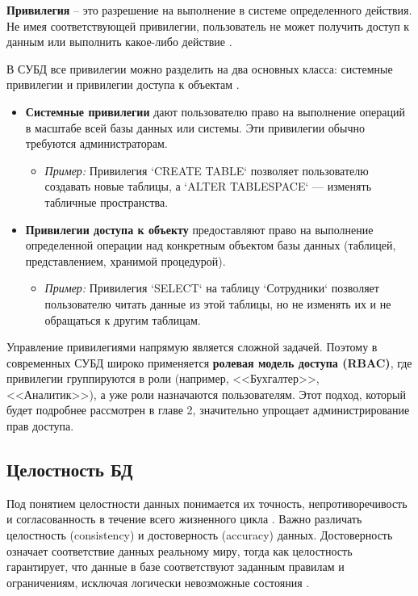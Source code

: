 \begin{grayquote}
	\textbf{Привилегия} – это разрешение на выполнение в системе определенного действия. Не имея соответствующей привилегии, пользователь не может получить доступ к данным или выполнить какое-либо действие \autocite{Smirnov2007}.
\end{grayquote}

В СУБД все привилегии можно разделить на два основных класса: системные привилегии и привилегии доступа к объектам \autocite{MicrosoftLearnSQLserverPerm}.

\begin{itemize}
    \item \textbf{Системные привилегии} дают пользователю право на выполнение операций в масштабе всей базы данных или системы. Эти привилегии обычно требуются администраторам.
    \begin{itemize}
        \item \textit{Пример:} Привилегия `CREATE TABLE` позволяет пользователю создавать новые таблицы, а `ALTER TABLESPACE` — изменять табличные пространства.
    \end{itemize}

    \item \textbf{Привилегии доступа к объекту} предоставляют право на выполнение определенной операции над конкретным объектом базы данных (таблицей, представлением, хранимой процедурой).
    \begin{itemize}
        \item \textit{Пример:} Привилегия `SELECT` на таблицу `Сотрудники` позволяет пользователю читать данные из этой таблицы, но не изменять их и не обращаться к другим таблицам.
    \end{itemize}
\end{itemize}

Управление привилегиями напрямую является сложной задачей. Поэтому в современных СУБД широко применяется \textbf{ролевая модель доступа (RBAC)}, где привилегии группируются в роли (например, <<Бухгалтер>>, <<Аналитик>>), а уже роли назначаются пользователям. Этот подход, который будет подробнее рассмотрен в главе 2, значительно упрощает администрирование прав доступа.

\subsection{Целостность БД}
Под понятием целостности данных понимается их точность, непротиворечивость и согласованность в течение всего жизненного цикла \autocite[с. 18]{Skakun}. Важно различать целостность (consistency) и достоверность (accuracy) данных. Достоверность означает соответствие данных реальному миру, тогда как целостность гарантирует, что данные в базе соответствуют заданным правилам и ограничениям, исключая логически невозможные состояния \autocite{ElmasriNavathe}.


